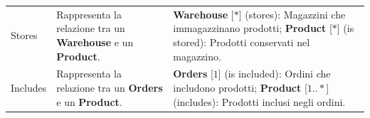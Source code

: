 \begin{tabularx}{\textwidth}{YYY}
  Stores &
  \begin{minipage}[c]{\linewidth}
    \vspace{0.5cm}
    Rappresenta la relazione tra un \textbf{Warehouse} e un \textbf{Product}. \newline
  \end{minipage} &
  \begin{minipage}[c]{\linewidth}
    \vspace{0.5cm}
    \textbf{Warehouse} [\(*\)]  (stores): Magazzini che immagazzinano prodotti; \newline
    \textbf{Product} [\(*\)] (is stored): Prodotti conservati nel magazzino. \newline
  \end{minipage} \\

  Includes &
  \begin{minipage}[c]{\linewidth}
    \vspace{0.5cm}
    Rappresenta la relazione tra un \textbf{Orders} e un \textbf{Product}. \newline
  \end{minipage} &
  \begin{minipage}[c]{\linewidth}
    \vspace{0.5cm}
    \textbf{Orders} [\(1\)]  (is included): Ordini che includono prodotti; \newline
    \textbf{Product} [\(1..*\)] (includes): Prodotti inclusi negli ordini. \newline
  \end{minipage} \\
  \bottomrule
\end{tabularx}

\newpage

